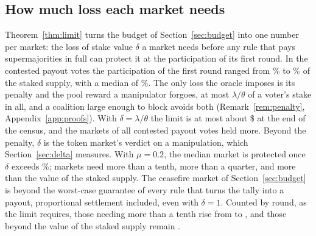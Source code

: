 \documentclass[conference,compsoc]{IEEEtran}
\newcommand{\muparam}{\mu}
\begin{document}
\subsection{How much loss each market needs}
\label{sec:cap}
 Theorem~\ref{thm:limit} turns the budget of Section~\ref{sec:budget} into one number per market: the loss of stake value $\delta$ a market needs before any rule that pays supermajorities in full can protect it at the participation of its first round. In the \rampMarkets{} contested payout votes the participation of the first round ranged from \piFirstMinPct\% to \piFirstMaxPct\% of the staked supply, with a median of \piFirstMedPct\%. The only loss the oracle imposes is its penalty and the pool reward a manipulator forgoes, at most $\lambda/\theta$ of a voter's stake in all, and a coalition large enough to block avoids both (Remark~\ref{rem:penalty}, Appendix~\ref{app:proofs}). With $\delta = \lambda/\theta$ the limit is at most about \$\penaltyCapUsd{} at the end of the census, and the markets of all \rampMarkets{} contested payout votes held more. Beyond the penalty, $\delta$ is the token market's verdict on a manipulation, which Section~\ref{sec:delta} measures. With $\muparam = 0.2$, the median market is protected once $\delta$ exceeds \rampDeltaNeedMedianPct\%; \rampNeedTenth{} markets need more than a tenth, \rampNeedQuarter{} more than a quarter, and \rampNeedOne{} more than the value of the staked supply. The ceasefire market of Section~\ref{sec:budget} is beyond the worst-case guarantee of every rule that turns the tally into a payout, proportional settlement included, even with $\delta = 1$. Counted by round, as the limit requires, those needing more than a tenth rise from \rampNeedTenth{} to \roundNeedTenth, and those beyond the value of the staked supply remain \roundNeedOne.
\end{document}
